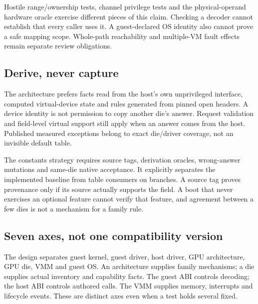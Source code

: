 {Hostile range/ownership tests, channel privilege tests and the physical-operand hardware
oracle exercise different pieces of this claim.}
{Checking a decoder cannot establish that every caller uses it. A guest-declared OS identity
also cannot prove a safe mapping scope. Whole-path reachability and multiple-VM fault effects
remain separate review obligations.}

\subsection{Derive, never capture}

\doc The architecture prefers facts read from the host's own unprivileged interface,
computed virtual-device state and rules generated from pinned open headers. A device identity
is not permission to copy another die's answer. Request validation and field-level virtual
support still apply when an answer comes from the host. Published measured exceptions belong
to exact die/driver coverage, not an invisible default table.

{The constants strategy requires source tags, derivation oracles, wrong-answer mutations and
same-die native acceptance. It explicitly separates the implemented baseline from table
consumers on branches.}
{A source tag proves provenance only if its source actually supports the field. A boot that
never exercises an optional feature cannot verify that feature, and agreement between a few
dies is not a mechanism for a family rule.}

\subsection{Seven axes, not one compatibility version}

\doc The design separates guest kernel, guest driver, host driver, GPU architecture,
GPU die, VMM and guest OS. An architecture supplies family mechanisms; a die supplies actual
inventory and capability facts. The guest ABI controls decoding; the host ABI controls authored
calls. The VMM supplies memory, interrupts and lifecycle events. These are distinct axes even
when a test holds several fixed.

